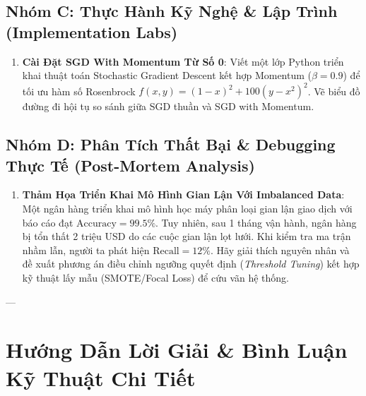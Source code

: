 \subsection{Nhóm C: Thực Hành Kỹ Nghệ \& Lập Trình (Implementation Labs)}

\begin{enumerate}[label=\textbf{C\arabic*.}]
  \item \textbf{Cài Đặt SGD With Momentum Từ Số 0}: Viết một lớp Python triển khai thuật toán Stochastic Gradient Descent kết hợp Momentum ($\beta = 0.9$) để tối ưu hàm số Rosenbrock $f(x, y) = (1 - x)^2 + 100(y - x^2)^2$. Vẽ biểu đồ đường đi hội tụ so sánh giữa SGD thuần và SGD with Momentum.
\end{enumerate}

\subsection{Nhóm D: Phân Tích Thất Bại \& Debugging Thực Tế (Post-Mortem Analysis)}

\begin{enumerate}[label=\textbf{D\arabic*.}]
  \item \textbf{Thảm Họa Triển Khai Mô Hình Gian Lận Với Imbalanced Data}: Một ngân hàng triển khai mô hình học máy phân loại gian lận giao dịch với báo cáo đạt $\text{Accuracy} = 99.5\%$. Tuy nhiên, sau 1 tháng vận hành, ngân hàng bị tổn thất 2 triệu USD do các cuộc gian lận lọt lưới. Khi kiểm tra ma trận nhầm lẫn, người ta phát hiện $\text{Recall} = 12\%$. Hãy giải thích nguyên nhân và đề xuất phương án điều chỉnh ngưỡng quyết định (\textit{Threshold Tuning}) kết hợp kỹ thuật lấy mẫu (SMOTE/Focal Loss) để cứu vãn hệ thống.
\end{enumerate}

---

\section{Hướng Dẫn Lời Giải \& Bình Luận Kỹ Thuật Chi Tiết}
\label{sec:ch05-solutions}

